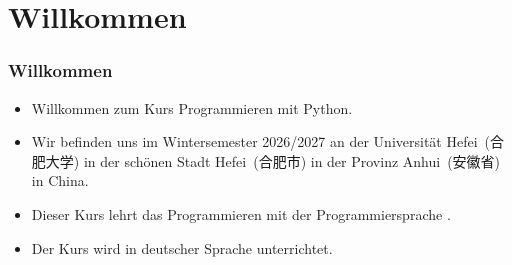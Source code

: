 \documentclass[aspectratio=169,mathserif,notheorems]{beamer}%
\subtitle{1.~Organisation}%
\begin{document}
%
%
\startPresentation%
%
\section{Willkommen}%
%
\begin{frame}[t]%
\frametitle{Willkommen}%
\begin{itemize}%
%
\item Willkommen zum Kurs \alert{Programmieren mit Python}.%
%
\item<2-> Wir befinden uns im Wintersemester 2026/2027 an der Universität Hefei~(合肥大学) in der schönen Stadt Hefei~(合肥市) in der Provinz Anhui~(安徽省) in China.%
%
\item<3-> Dieser Kurs lehrt das Programmieren mit der Programmiersprache \python.%
%
\item<4-> Der Kurs wird in deutscher Sprache unterrichtet.%
%
\end{itemize}%
\end{frame}%
%
\end{document}
